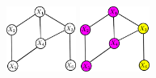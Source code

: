 \documentclass{article} %
\begin{document}
\newcommand{\gimgwidth}{0.9in}
\newcommand{\gimgspone}{0.3in}
\newcommand{\gimgsptwo}{0.04in}
\begin{figure}
\begin{center}
\includegraphics[width=\gimgwidth]{figures/orig_graph} \hspace{\gimgspone}
\includegraphics[width=\gimgwidth]{figures/bg2} \hspace{\gimgsptwo}

\end{center}
\end{figure}
\end{document}
